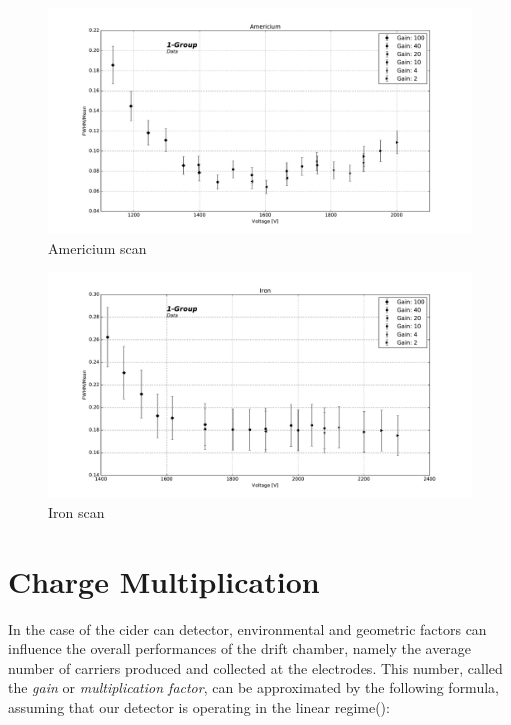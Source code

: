 \begin{figure}[htb]
  \includegraphics[width=\linewidth]{graphics/americium_scan}
  \caption{Americium scan}
  \label{fig:resolution:americium}
\end{figure}

\begin{figure}[htb]
  \includegraphics[width=\linewidth]{graphics/iron_scan}
  \caption{Iron scan}
  \label{fig:resolution:iron}
\end{figure}



\section{Charge Multiplication}
\label{sec:systematics}

In the case of the cider can detector, environmental and geometric factors can influence the overall performances of the drift chamber, namely the average number of carriers produced and collected at the electrodes. This number, called the \textit{gain} or \textit{multiplication factor}, can be approximated by the following formula, assuming that our detector is operating in the linear regime(\cite{gas_detect}):

